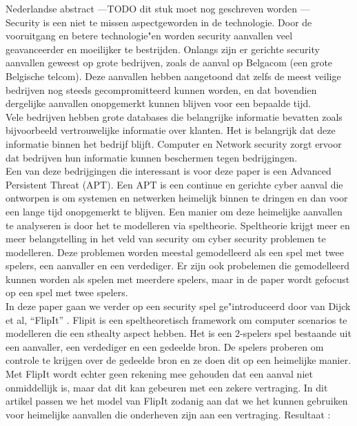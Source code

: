 \documentclass[master=cws, masteroption=vs]{kulemt}
\begin{document}
\begin{abstract*}
Nederlandse abstract
---TODO dit stuk moet nog geschreven worden --- \\

Security is een niet te missen aspectgeworden in de technologie. Door de vooruitgang en betere technologie"en worden security aanvallen veel geavanceerder en moeilijker te bestrijden. Onlangs zijn er gerichte security aanvallen geweest op grote bedrijven, zoals de aanval op Belgacom (een grote Belgische telcom). Deze aanvallen hebben aangetoond dat zelfs de meest veilige
bedrijven nog steeds gecompromitteerd kunnen worden, en dat bovendien dergelijke aanvallen onopgemerkt kunnen blijven voor een bepaalde tijd. \\

Vele bedrijven hebben grote databases die belangrijke informatie bevatten zoals bijvoorbeeld vertrouwelijke informatie over klanten. Het is belangrijk dat deze informatie binnen het bedrijf blijft. Computer en Network security zorgt ervoor dat bedrijven hun informatie kunnen beschermen tegen bedrijgingen. \\
Een van deze bedrijgingen die interessant is voor deze paper is een Advanced Persistent Threat (APT). Een APT is een continue en gerichte cyber aanval die ontworpen is om systemen en netwerken heimelijk binnen te dringen en dan voor een lange tijd onopgemerkt te blijven. Een manier om deze heimelijke aanvallen te analyseren is door het te modelleren via speltheorie. Speltheorie krijgt meer en meer belangstelling in het veld van security om cyber security problemen te modelleren. Deze problemen worden meestal gemodelleerd als een spel met twee spelers, een aanvaller en een verdediger. Er zijn ook probelemen die gemodelleerd kunnen worden als spelen met meerdere spelers, maar in de paper wordt gefocust op een spel met twee spelers. \\

In deze paper gaan we verder op een security spel ge"introduceerd door van Dijck et al, ``FlipIt'' \citep{FlipIt}.
Flipit is een speltheoretisch framework om computer scenarios te modelleren die een sthealty aspect hebben. Het is een 2-spelers spel bestaande uit een aanvaller, een verdediger en een gedeelde bron.  De spelers proberen om controle te krijgen over de gedeelde bron en ze
doen dit op een heimelijke manier. Met FlipIt wordt echter geen rekening mee gehouden dat een aanval niet onmiddellijk is, maar dat dit kan gebeuren met een zekere vertraging. In dit artikel passen we het model van FlipIt zodanig aan dat we het kunnen gebruiken voor heimelijke aanvallen die onderheven zijn aan een vertraging.
Resultaat : \\


\end{abstract*}
\end{document}
